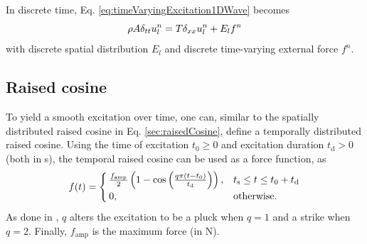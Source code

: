 In discrete time, Eq. \eqref{eq:timeVaryingExcitation1DWave} becomes
\begin{equation}
    \rho A \delta_{tt} u_l^n = T \delta_{xx} u_l^n + E_lf^n
\end{equation}
with discrete spatial distribution $E_l$ and discrete time-varying external force $f^n$.

\subsection{Raised cosine}\label{sec:timeVaryingRaisedCos}
To yield a smooth excitation over time, one can, similar to the spatially distributed raised cosine in Eq. \ref{sec:raisedCosine}, define a temporally distributed raised cosine. Using the time of excitation $t_0\geq 0$ and excitation duration $t_\text{d}>0$ (both in s), the temporal raised cosine can be used as a force function, as
\begin{equation}\label{eq:raisedCosTemp}
    f(t) = 
    \begin{cases}
        \frac{f_\text{amp}}{2} \left(1 - \cos\left(\frac{q\pi (t - t_0)}{t_\text{d}}\right)\right), & t_{\text{s}} \leq t \leq t_0 + t_\text{d}\\
        0, &\text{otherwise}.
    \end{cases}
\end{equation} 
As done in \cite{Webb2015, Bilbao2019}, $q$ alters the excitation to be a pluck when $q=1$ and a strike when $q=2$. Finally, $f_\text{amp}$ is the maximum force (in N). 
\def\figWidth{0.8}
